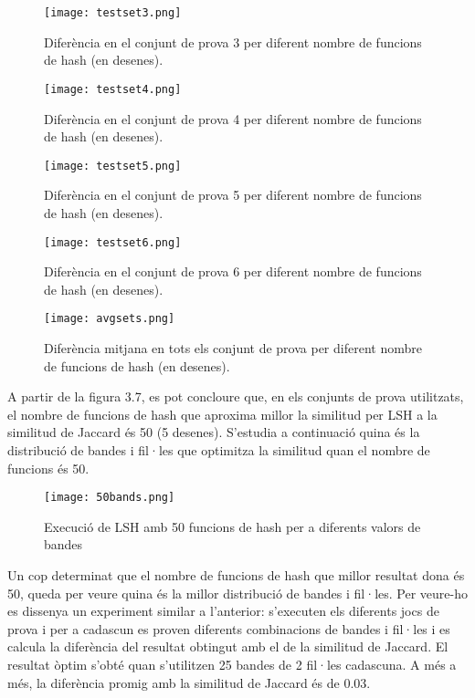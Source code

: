 \documentclass[catalan, 12pt]{report}
\begin{document}
\begin{figure}[!h]
  \centering
  \texttt{[image: testset3.png]}
  \centering
  \caption[Caption for LOF]{Diferència en el conjunt de prova 3 per diferent nombre de funcions de hash (en desenes).\protect}
\end{figure}

\begin{figure}[!h]
  \centering
  \texttt{[image: testset4.png]}
  \centering
  \caption[Caption for LOF]{Diferència en el conjunt de prova 4 per diferent nombre de funcions de hash (en desenes).\protect}
\end{figure}

\begin{figure}[!h]
  \centering
  \texttt{[image: testset5.png]}
  \centering
  \caption[Caption for LOF]{Diferència en el conjunt de prova 5 per diferent nombre de funcions de hash (en desenes).\protect}
\end{figure}

\begin{figure}[!h]
  \centering
  \texttt{[image: testset6.png]}
  \centering
  \caption[Caption for LOF]{Diferència en el conjunt de prova 6 per diferent nombre de funcions de hash (en desenes).\protect}
\end{figure}

\begin{figure}[!h]
  \centering
  \texttt{[image: avgsets.png]}
  \centering
  \caption[Caption for LOF]{Diferència mitjana en tots els conjunt de prova per diferent nombre de funcions de hash (en desenes).\protect}
\end{figure}

\newpage
A partir de la figura 3.7, es pot concloure que, en els conjunts de prova utilitzats, el nombre de funcions de hash que aproxima millor la similitud per LSH a la similitud de Jaccard és 50 (5 desenes). S'estudia a continuació quina és la distribució de bandes i fil·les que optimitza la similitud quan el nombre de funcions és 50. \newline

\begin{figure}[!h]
  \centering
  \texttt{[image: 50bands.png]}
  \centering
  \caption[Caption for LOF]{Execució de LSH amb 50 funcions de hash per a diferents valors de bandes\protect}
\end{figure}

Un cop determinat que el nombre de funcions de hash que millor resultat dona és 50, queda per veure quina és la millor distribució de bandes i fil·les. Per veure-ho es dissenya un experiment similar a l'anterior: s'executen els diferents jocs de prova i per a cadascun es proven diferents combinacions de bandes i fil·les i es calcula la diferència del resultat obtingut amb el de la similitud de Jaccard. El resultat òptim s'obté quan s'utilitzen 25 bandes de 2 fil·les cadascuna. A més a més, la diferència promig amb la similitud de Jaccard és de 0.03. \newline
\end{document}
